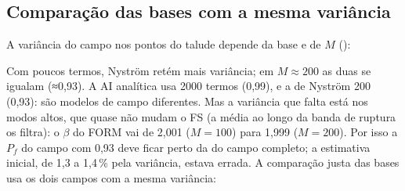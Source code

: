 \documentclass[11pt,a4paper]{article}
\begin{document}
\subsection{Comparação das bases com a mesma variância}\label{sec:mesmavar}
A variância do campo nos pontos do talude depende da base e de $M$ ():
\begin{table}[H]\centering\small
{}
\caption{Variância média do campo nos pontos do talude (alvo 1). O teto de Nyström vem da quadratura de 2400 nós: a
interpolação entre os nós não reproduz o bico do kernel exponencial.}
\end{table}
Com poucos termos, Nyström retém mais variância; em $M \approx 200$ as duas se igualam (≈0,93). A AI analítica usa 2000
termos (0,99), e a de Nyström 200 (0,93): são modelos de campo diferentes. Mas a variância que falta está nos modos
altos, que quase não mudam o FS (a média ao longo da banda de ruptura os filtra): o $\beta$ do FORM vai de 2,001
($M = 100$) para 1,999 ($M = 200$). Por isso a $P_f$ do campo com 0,93 deve ficar perto da do campo completo; a
estimativa inicial, de 1,3 a 1,4\,\% pela variância, estava errada. A comparação justa das bases usa os dois campos
com a mesma variância:
\begin{table}[H]\centering\small
{}
\caption{AI no PC, semente 3, a mesma das AI analíticas da Tabela 1 (os sorteios são os mesmos). A referência de
24\,000 é do campo completo (2000 termos) e só vale aproximadamente aqui.}
\end{table}
\end{document}
